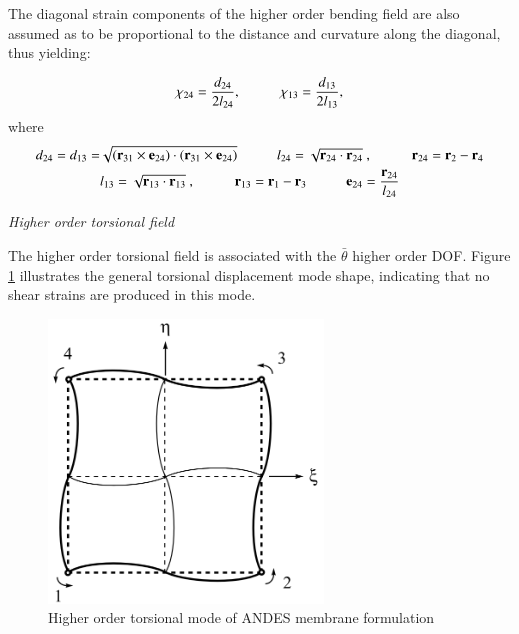 The diagonal strain components of the higher order bending field are also assumed as to be proportional to the distance and curvature along the diagonal, thus yielding:  

\begin{equation} 
\chi_{24} = \frac{d_{24}}{2 l_{24}},
\hspace{10mm}
\chi_{13} = \frac{d_{13}}{2 l_{13}},
\label{equation12chi24}
\end{equation}
where
\begin{align*} 
\begin{split}
	d_{24} = d_{13} = & \sqrt{(\mathbf{r}_{31} \times \mathbf{e}_{24}) \cdot (\mathbf{r}_{31} \times \mathbf{e}_{24})} \hspace{10mm}
	l_{24} = \sqrt{\mathbf{r}_{24} \cdot \mathbf{r}_{24}}\ ,
	\hspace{10mm}
	\mathbf{r}_{24} = \mathbf{r}_2 - \mathbf{r}_4 \\
	& l_{13} = \sqrt{\mathbf{r}_{13} \cdot \mathbf{r}_{13}}\ ,
	\hspace{10mm}
	\mathbf{r}_{13} = \mathbf{r}_1 - \mathbf{r}_3
	\hspace{10mm}
	\mathbf{e}_{24} = \frac{\mathbf{r}_{24}}{l_{24}}
	\end{split}
\end{align*}

\textit{Higher order torsional field}

The higher order torsional field is associated with the $\bar{\theta}$ higher order DOF. Figure \ref{fig:AndesTorsional} illustrates the general torsional displacement mode shape, indicating that no shear strains are produced in this mode.

\begin{figure}[H]
	\centering
	\def\svgwidth{\columnwidth}
	\includegraphics[width=7.3cm]{images/ANDES_torsional_mode.png}
	\caption{Higher order torsional mode of ANDES membrane formulation \cite{Hau94}}
	\label{fig:AndesTorsional}
\end{figure}

